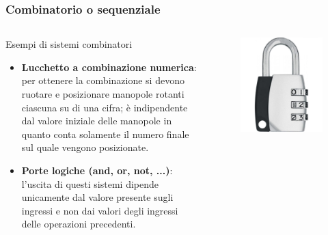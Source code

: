 \begin{frame}
	\frametitle{Combinatorio o sequenziale}
	

	\begin{columns}			
		
		\begin{block}{Esempi di sistemi combinatori}
			\begin{itemize}
				\item \textbf{Lucchetto a combinazione numerica}:\\per ottenere la combinazione si devono ruotare e posizionare manopole rotanti ciascuna su di una cifra; è indipendente dal valore iniziale delle manopole in quanto conta solamente il numero finale sul quale vengono posizionate.
				\item \textbf{Porte logiche (and, or, not, ...)}:\\l'uscita di questi sistemi dipende unicamente dal valore presente sugli ingressi e non dai valori degli ingressi delle operazioni precedenti.
			\end{itemize}
		\end{block}
					
		\begin{figure}[!htbp] 
			\centering
			\includegraphics[width=0.7\linewidth]{images/1_i_sistemi/lock.png}
		\end{figure}
		

\end{columns}
\end{frame}
